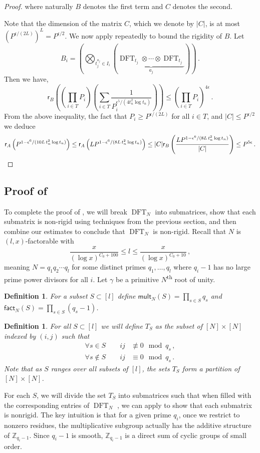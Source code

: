 \documentclass{toc}
\newtheorem{define}[theorem]{Definition}
\renewcommand\Z{{\mathbb{Z}}}
\renewcommand\fact{\textsf{fact}}
\newcommand\mult{\textsf{mult}}
\newcommand{\ts}{\textsuperscript}
\DeclareMathOperator{\DFT}{DFT}
\begin{document}
\begin{proof}
\noindent where naturally $B$ denotes the first term and $C$ denotes the second.

Note that the dimension of the matrix $C$, which we denote by $|C|$, is at most $\left( P^{\epsilon/(2L)} \right)^L = P^{\epsilon/2}$.  We now apply  repeatedly to bound the rigidity of $B$.  Let %
%
\[B_i = \left(\bigotimes_{t_j^{a_j} \in I_i} (\underbrace{\DFT_{t_j} \otimes \cdots \otimes \DFT_{t_j}}_\text{$a_j$})\right) \,.\]
%
Then we have,
\[
\textsf{r}_B\left( \left(\prod_{i \in T}P_i \right) \left(\sum_{i \in T} \frac{1}{P_i^{\epsilon^5/(4t_n^2 \log t_n)}}\right)\right) \leq \left(\prod_{i \in T}P_i\right)^{4 \epsilon} \,.
\]
{}From the above inequality, the fact that $P_i \geq P^{\epsilon/(2L)}$ for all $i \in T$, and $|C| \leq P^{\epsilon/2}$ we deduce
\[
\textsf{r}_A\left( P^{1 - \epsilon^6/(10L\,t_n^2 \log t_n)}\right) \leq \textsf{r}_A\left( LP^{1 - \epsilon^6/(8L\,t_n^2 \log t_n)}\right)  \leq |C|\textsf{r}_B\left( \frac{ LP^{1 - \epsilon^6/(8L\,t_n^2 \log t_n)}}{|C|}\right)   \leq P^{5 \epsilon} \,. \qedhere
\]
\end{proof}


\subsection{Proof of }
To complete the proof of , we will break %
$\DFT_N$ %
into submatrices, show that each submatrix is non-rigid using techniques from the previous section, and then combine our estimates to conclude that %
$\DFT_N$ %
 is non-rigid.  Recall that $N$ is $(l,x)$-factorable with 
 \[\frac{x}{(\log x)^{C_0 + 100}} \leq l \leq\frac{x}{(\log x)^{C_0+10}} \,,\] meaning $N = q_1q_2 \cdots q_l$ for some distinct primes $q_1, \dots , q_l$ where $q_i - 1$ has no large prime power divisors for all $i$.  Let $\gamma$ be a primitive $N$\ts{th} root of unity.
\begin{define}\label{def_multandfact}
For a subset $S \subset [l]$ define $\mult_N(S) =  \prod_{s \in S} q_s$ and $\fact_N(S) = \prod_{s \in S} (q_s-1)$.
\end{define} 
\begin{define} For all $S \subset [l]$ we will define $T_S$ as the subset of $[N] \times [N]$ indexed by $(i,j)$ such that 
%
\begin{align*}
\forall s \in S \qquad ij &\not\equiv 0 \mod q_s \,, \\
\forall s \notin S \qquad ij &\equiv 0 \mod q_s  \,.
\end{align*}
Note that as $S$ ranges over all subsets of $[l]$, the sets $T_S$ form a partition of $[N] \times [N]$.
\end{define}
For each $S$, we will divide the set $T_S$ into submatrices such that when filled with the corresponding entries of %
$\DFT_N$ %
, we can apply  to show that each submatrix is nonrigid.  The key intuition is that for a given prime $q_i$, once we restrict to nonzero residues, the multiplicative subgroup actually has the additive structure of $\Z_{q_i - 1}$.  Since $q_i - 1$ is smooth, $\Z_{q_i - 1}$ is a direct sum of cyclic groups of small order.
\end{document}
